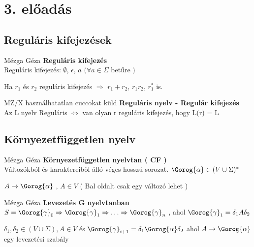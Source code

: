\section{3. előadás}
\subsection{Reguláris kifejezések}

\begin{definicio}{Mézga Géza}
	\textbf{Reguláris kifejezés} \\[3pt]
  Reguláris kifejezés: $\emptyset$, $\epsilon$, $a$ $(\forall a \in \Sigma$ betűre $)$

  Ha $r_1$ és $r_2$ reguláris kifejezés $\Rightarrow$ $r_1 + r_2$, $r_1 r_2$, $r_1^*$  is.  \\[0pt]
\end{definicio}

   \begin{tetel}{MZ/X használhatatlan cuccokat küld}
    \textbf{Reguláris nyelv - Regulár kifejezés} \\[3pt]
  Az L nyelv Reguláris $\Leftrightarrow$ van olyan r reguláris kifejezés, hogy L(r) = L
\end{tetel}

\subsection{Környezetfüggetlen nyelv}

\begin{definicio}{Mézga Géza}
   \textbf{Környezetfüggetlen nyelvtan ( CF ) } \\[3pt]
  Változókból és karaktereiből álló véges hosszú sorozat. $\Gorog{\alpha} \in (V \cup \Sigma)^* $

  $A \rightarrow \Gorog{\alpha}$ , $A \in V$ ( Bal oldalt csak egy változó lehet )  \\[0pt]
\end{definicio}

\begin{definicio}{Mézga Géza}
  \textbf{Levezetés G nyelvtanban } \\[3pt]
  $S = \Gorog{\gamma}_0 \Rightarrow \Gorog{\gamma}_1 \Rightarrow \ldots \Rightarrow \Gorog{\gamma}_n$ , ahol $\Gorog{\gamma}_1 = \delta_1 A \delta_2 $

  $\delta_1,\delta_2 \in (V \cup \Sigma), A \in V$ és $\Gorog{\gamma}_{i+1} = \delta_1 \Gorog{\alpha} \delta_2$ ahol $A \rightarrow \Gorog{\alpha}$ egy levezetési szabály \\[0pt]
\end{definicio}

